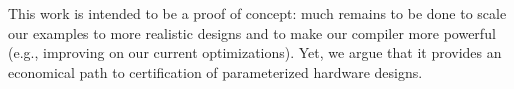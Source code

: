\documentclass{llncs}
\begin{document}
This work is intended to be a proof of concept: much remains to be
done to scale our examples to more realistic designs and to make our
compiler more powerful (e.g., improving on our current
optimizations). Yet, we argue that it provides an economical path to
certification of parameterized hardware designs.


\end{document}
